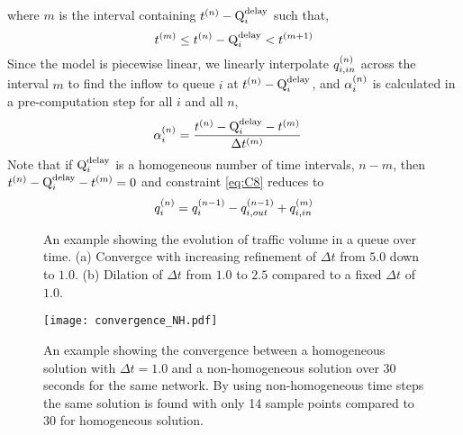 where $m$ is the interval containing $\tn - \QDELAY{i}$ such that, 
\begin{equation}
\tn[m] \le \tn-\QDELAY{i} < \tn[m+1]
\end{equation}
Since the model is piecewise linear, we linearly interpolate $\qin{i}$ across the interval $m$ to find the inflow to queue $i$ at $\tn - \QDELAY{i}$, and $\aph{i}$ is calculated in a pre-computation step for all $i$ and all $n$,
\begin{align}
\aph{i} &= \frac{\tn - \QDELAY{i} - \tn[m]}{\DT[m]}
\end{align}
Note that if $\QDELAY{i}$ is a homogeneous number of time intervals, $n-m$, then $\tn - \QDELAY{i} - \tn[m]=0$ and constraint \ref{eq:C8} reduces to
\begin{equation}
\q{i} = \q[n-1]{i} - \qout[n-1]{i} + \qin[m]{i}
\end{equation}


\begin{figure*}[t!]
\centering
\caption{An example showing the evolution of traffic volume in a queue over time. (a) Convergce with increasing refinement of $\Delta t$ from $5.0$ down to $1.0$. (b) Dilation of $\Delta t$ from $1.0$ to $2.5$ compared to a fixed $\Delta t$ of $1.0$.}

\end{figure*}

\begin{figure*}[t!]
\centering

\label{subfig:converg_c}
\texttt{[image: convergence\_NH.pdf]}
\caption{An example showing the convergence between a homogeneous solution with $\Delta t=1.0$ and a non-homogeneous solution over 30 seconds for the same network. By using non-homogeneous time steps the same solution is found with only 14 sample points compared to 30 for homogeneous solution.}

\end{figure*}

